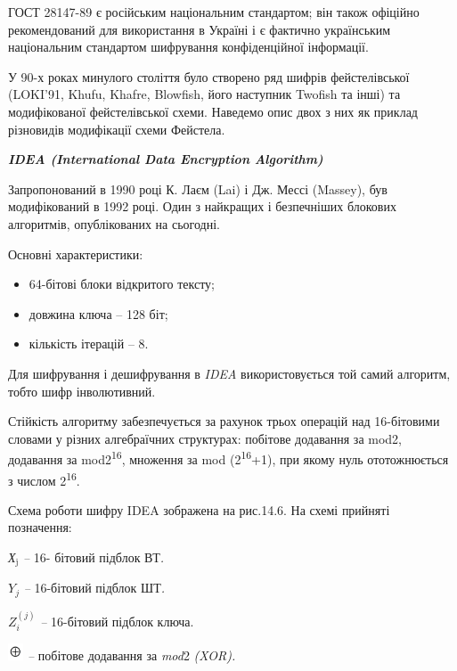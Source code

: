 \documentclass[a4paper]{article}
\newcommand\textsubscript[1]{\ensuremath{{}_{\text{#1}}}}
\newcommand\liststyleWWviiiNumxlvi{%
\renewcommand\labelitemi{\textlatin{[F0B7?]}}
\renewcommand\labelitemii{o}
\renewcommand\labelitemiii{\textlatin{[F0A7?]}}
\renewcommand\labelitemiv{\textlatin{[F0B7?]}}
}
\newcounter{}
\begin{document}
\bigskip


\bigskip

ГОСТ 28147-89 є російським національним стандартом; він також офіційно
рекомендований для використання в Україні і є фактично українським національним
стандартом шифрування конфіденційної інформації.


\bigskip

У 90-х роках минулого століття було створено ряд шифрів фейстелівської (LOKI’91,
Khufu, Khafre, Blowfish, його наступник Twofish та інші) та модифікованої
фейстелівської схеми.  Наведемо опис двох з них як приклад різновидів
модифікації схеми Фейстела.\textbf{\textit{ }}


\bigskip


\bigskip

{\centering\bfseries\itshape
IDEA (International Data Encryption Algorithm)
\par}


\bigskip

Запропонований в 1990 році К. Лаєм (Lai) і Дж. Мессі (Massey), був модифікований
в 1992 році. Один з найкращих і безпечніших блокових алгоритмів, опублікованих
на сьогодні.

Основні характеристики:

\liststyleWWviiiNumxlvi
\begin{itemize}
\item 64-бітові блоки відкритого тексту;
\item довжина ключа – 128 біт;
\item кількість ітерацій – 8.
\end{itemize}
Для шифрування і дешифрування в \textit{IDEA} використовується той самий
алгоритм, тобто шифр інволютивний.

Стійкість алгоритму забезпечується за рахунок трьох операцій над 16-бітовими
словами у різних алгебраїчних структурах: побітове додавання за mod2, додавання
за mod2\textsuperscript{16}, множення за mod (2\textsuperscript{16}+1), при
якому нуль ототожнюється з числом 2\textsuperscript{16}.

Схема роботи шифру IDEA зображена на рис.14.6. На схемі прийняті позначення:

\textit{Х}\textit{\textsubscript{j}}\textit{ –} 16- бітовий підблок ВТ\textit{.}

 ${Y_{{j}}}$\textit{ – }16-бітовий підблок ШТ\textit{.}

 ${Z_{{i}}^{{(j)}}}$\textit{ – }16-бітовий підблок ключа.

 \includegraphics[width=0.1807in,height=0.1937in]{crypt-img/crypt-img299.png}
\textit{ –} побітове додавання за\textit{ }\textit{mod}2\textit{
(}\textit{XOR}\textit{).}
\end{document}
